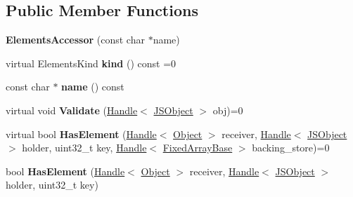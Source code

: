 \subsection*{Public Member Functions}
\begin{DoxyCompactItemize}
\item 
\hypertarget{classv8_1_1internal_1_1_elements_accessor_afd173d3eec2fdc84c886bce26c4066ab}{}{\bfseries Elements\+Accessor} (const char $\ast$name)\label{classv8_1_1internal_1_1_elements_accessor_afd173d3eec2fdc84c886bce26c4066ab}

\item 
\hypertarget{classv8_1_1internal_1_1_elements_accessor_a7003cf233f77388cfda6e20af7b5f6ac}{}virtual Elements\+Kind {\bfseries kind} () const =0\label{classv8_1_1internal_1_1_elements_accessor_a7003cf233f77388cfda6e20af7b5f6ac}

\item 
\hypertarget{classv8_1_1internal_1_1_elements_accessor_ab475578277c9dbd4fb1ef558ab6203d8}{}const char $\ast$ {\bfseries name} () const \label{classv8_1_1internal_1_1_elements_accessor_ab475578277c9dbd4fb1ef558ab6203d8}

\item 
\hypertarget{classv8_1_1internal_1_1_elements_accessor_a67084696f2a29ae768cb2ac452ab0816}{}virtual void {\bfseries Validate} (\hyperlink{classv8_1_1internal_1_1_handle}{Handle}$<$ \hyperlink{classv8_1_1internal_1_1_j_s_object}{J\+S\+Object} $>$ obj)=0\label{classv8_1_1internal_1_1_elements_accessor_a67084696f2a29ae768cb2ac452ab0816}

\item 
\hypertarget{classv8_1_1internal_1_1_elements_accessor_a439d3092bcce93a430fe05ab8e6b1e23}{}virtual bool {\bfseries Has\+Element} (\hyperlink{classv8_1_1internal_1_1_handle}{Handle}$<$ \hyperlink{classv8_1_1internal_1_1_object}{Object} $>$ receiver, \hyperlink{classv8_1_1internal_1_1_handle}{Handle}$<$ \hyperlink{classv8_1_1internal_1_1_j_s_object}{J\+S\+Object} $>$ holder, uint32\+\_\+t key, \hyperlink{classv8_1_1internal_1_1_handle}{Handle}$<$ \hyperlink{classv8_1_1internal_1_1_fixed_array_base}{Fixed\+Array\+Base} $>$ backing\+\_\+store)=0\label{classv8_1_1internal_1_1_elements_accessor_a439d3092bcce93a430fe05ab8e6b1e23}

\item 
\hypertarget{classv8_1_1internal_1_1_elements_accessor_ad556de15190d1e0fe8a46fe5f99cba83}{}bool {\bfseries Has\+Element} (\hyperlink{classv8_1_1internal_1_1_handle}{Handle}$<$ \hyperlink{classv8_1_1internal_1_1_object}{Object} $>$ receiver, \hyperlink{classv8_1_1internal_1_1_handle}{Handle}$<$ \hyperlink{classv8_1_1internal_1_1_j_s_object}{J\+S\+Object} $>$ holder, uint32\+\_\+t key)\label{classv8_1_1internal_1_1_elements_accessor_ad556de15190d1e0fe8a46fe5f99cba83}


\end{DoxyCompactItemize}
